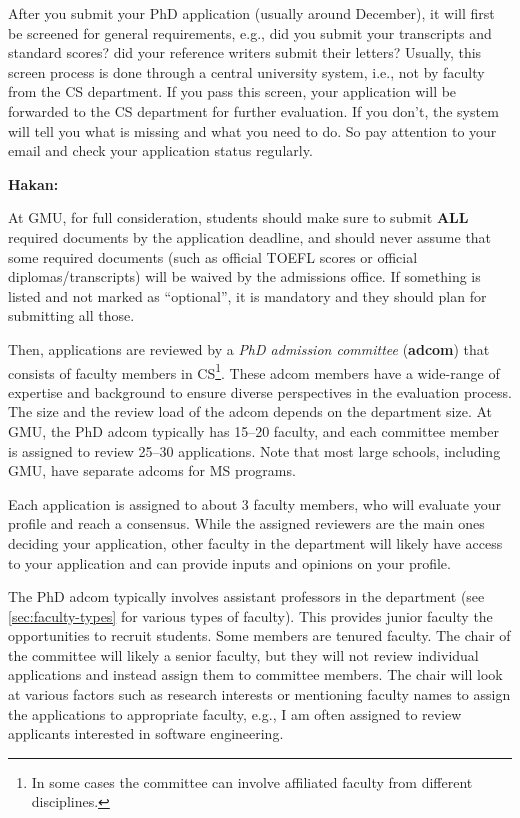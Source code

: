 \documentclass[oneside,11pt,dvipsnames]{book}
\newenvironment{commentbox}[1][]{
  \small
  \begin{mybox}
    {\small \textbf{#1}}
  }{
  \end{mybox}
}
\begin{document}
After you submit your PhD application (usually around December), it will first be screened
for general requirements, e.g., did you submit your transcripts and standard scores? did your reference writers submit their letters? Usually, this screen process is done through a central university system, i.e., not by faculty from the CS department. If you pass this screen, your application will be forwarded to the CS department for further evaluation. If you don't,  the system will tell you what is missing and what you need to do. So pay attention to your email and check your application status regularly.

\begin{commentbox}[Hakan:]
  At GMU, for full consideration, students should make sure to submit \textbf{ALL} required documents by the application deadline, and should never assume that some required documents (such as official TOEFL scores or official diplomas/transcripts) will be waived by the admissions office. If something is listed and not marked as ``optional'', it is mandatory and they should plan for submitting all those.
\end{commentbox}

Then, applications are reviewed by a \emph{PhD admission committee} (\textbf{adcom}) that consists of faculty members in CS\footnote{In some cases the committee can involve affiliated faculty from different disciplines.}. These adcom members have a wide-range of expertise and background to ensure diverse perspectives in the evaluation process. The size and the review load of the adcom depends on the department size. At GMU, the PhD adcom typically has 15--20 faculty, and each committee member is assigned to review 25--30 applications. Note that most large schools, including GMU, have separate adcoms for MS programs.

Each application is assigned to about 3 faculty members, who will evaluate your profile and reach a consensus.  While the assigned reviewers are the main ones deciding your application, other faculty in the department will likely have access to your application and can provide inputs and opinions on your profile.

The PhD adcom typically involves assistant professors in the department (see \autoref{sec:faculty-types} for various types of faculty). This provides junior faculty the opportunities to recruit students. Some members are tenured faculty. The chair of the committee will likely a senior faculty, but they will not review individual applications and instead assign them to committee members. The chair will look at various factors such as research interests or mentioning faculty names to assign the applications to appropriate faculty, e.g., I am often assigned to review applicants interested in software engineering.
\end{document}
